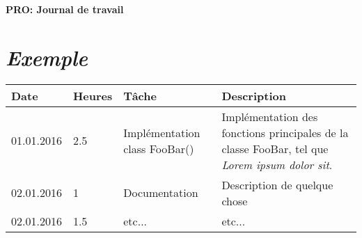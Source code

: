 \documentclass[french]{article}
\begin{document}
	\centering
	\large{\textbf{PRO: Journal de travail}}
	
	\justify
	
	\section*{\huge \textit{Exemple}}
	\begin{tabular}{p{}|p{}|p{}|p{}}
		Date&Heures&Tâche&Description\\
		\hline
		01.01.2016&2.5&Implémentation class FooBar()&Implémentation des fonctions principales de la classe FooBar, tel que \textit{Lorem ipsum dolor sit}.\\
		\hline
		02.01.2016&1&Documentation&Description de quelque chose\\
		\hline
		02.01.2016&1.5&etc...&etc...
	\end{tabular}
	
\end{document}
